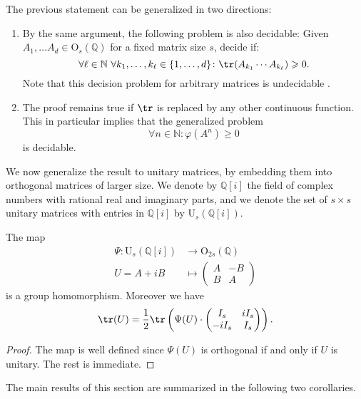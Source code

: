 \begin{remark}\label{rem:generalizations} The previous statement can be generalized in two directions:
\begin{enumerate}[label=($\roman*$)] 
	\item By the same argument, the following problem is also decidable: 
		Given $A_1, \ldots A_d\in \mathrm{O}_s(\mathbb{Q})$ for a fixed matrix size $s$, decide if:
	$$\forall \ell \in \mathbb{N}\  \forall k_1, \ldots, k_\ell \in \{1, \ldots, d\}\colon \tr(A_{k_1} \cdots A_{k_\ell}) \geqslant 0.$$
	Note that this decision problem for arbitrary matrices is undecidable \cite{DCCW}.
	\item\label{generalizations:ii} The proof remains true if $\tr$ is replaced by any other continuous function. This in particular implies that the generalized problem
	$$\forall n \in \mathbb{N}\colon \varphi(A^n) \geqslant 0$$
	is decidable. \demo
\end{enumerate}
\end{remark}

We now generalize the result to unitary matrices, by embedding them into orthogonal matrices of larger size. We denote by $\mathbb{Q}[i]$ the field of complex numbers with rational real and imaginary parts, and we denote the set of $s \times s$ unitary matrices with entries in $\mathbb{Q}[i]$ by $\mathrm{U}_s(\mathbb{Q}[i])$.

\begin{lemma}
\label{lem:UtoO_embedding}
The map
\begin{align*}\Psi \colon \mathrm{U}_s(\mathbb{Q}[i]) &\to \mathrm{O}_{2s}(\mathbb{Q}) \\ U = A + iB &\mapsto \begin{pmatrix}
A & -B \\ B & A
\end{pmatrix}
\end{align*}
is a group homomorphism. Moreover we have 
$$\tr(U) = \frac{1}{2} \tr\left(\Psi(U) \cdot \begin{pmatrix} I_s & i I_s \\ -i I_s & I_s \end{pmatrix} \right).$$
\end{lemma}
\begin{proof}
The map is well defined since $\Psi(U)$ is orthogonal if and only if $U$ is unitary. The rest is immediate.
\end{proof}

The main results of this section are summarized in the following two corollaries.


